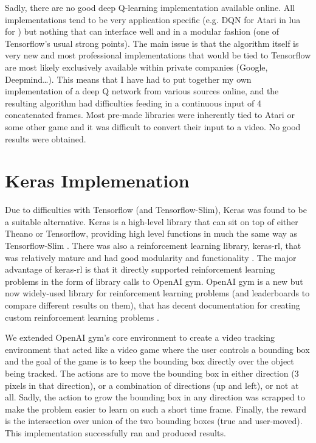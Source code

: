 \documentclass[letterpaper,12pt,titlepage,oneside,final]{book}
\begin{document}
Sadly, there are no good deep Q-learning implementation available online. All implementations tend to be very application specific (e.g. DQN for Atari in lua for \cite{atari-dqn}) but nothing that can interface well and in a modular fashion (one of Tensorflow's usual strong points). The main issue is that the algorithm itself is very new and most professional implementations that would be tied to Tensorflow are most likely exclusively available within private companies (Google, Deepmind\dots). This means that I have had to put together my own implementation of a deep Q network from various sources online, and the resulting algorithm had difficulties feeding in a continuous input of 4 concatenated frames. Most pre-made libraries were inherently tied to Atari or some other game and it was difficult to convert their input to a video. No good results were obtained.

\section{Keras Implemenation}
Due to difficulties with Tensorflow (and Tensorflow-Slim), Keras was found to be a suitable alternative. Keras is a high-level library that can sit on top of either Theano or Tensorflow, providing high level functions in much the same way as Tensorflow-Slim \cite{keras}. There was also a reinforcement learning library, keras-rl, that was relatively mature and had good modularity and functionality \cite{keras-rl}. The major advantage of keras-rl is that it directly supported reinforcement learning problems in the form of library calls to OpenAI gym. OpenAI gym is a new but now widely-used library for reinforcement learning problems (and leaderboards to compare different results on them), that has decent documentation for creating custom reinforcement learning problems \cite{openai-gym}.

We extended OpenAI gym's core environment to create a video tracking environment that acted like a video game where the user controls a bounding box and the goal of the game is to keep the bounding box directly over the object being tracked. The actions are to move the bounding box in either direction (3 pixels in that direction), or a combination of directions (up and left), or not at all. Sadly, the action to grow the bounding box in any direction was scrapped to make the problem easier to learn on such a short time frame. Finally, the reward is the intersection over union of the two bounding boxes (true and user-moved). This implementation successfully ran and produced results.
\end{document}
